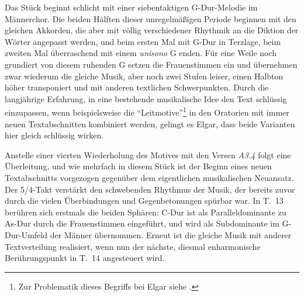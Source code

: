 \documentclass[a4paper,11pt,open=any]{scrbook}
\begin{document}
Das Stück beginnt schlicht mit einer siebentaktigen G-Dur-Melodie im
Männerchor.  Die beiden Hälften dieser unregelmäßigen Periode beginnen
mit den gleichen Akkorden, die aber mit völlig verschiedener Rhythmik
an die Diktion der Wörter angepasst werden, und beim ersten Mal mit G-Dur
in Terzlage, beim zweiten Mal überraschend mit einem \textit{unisono}
\textsf{G} enden.  Für eine Weile noch grundiert von diesem ruhenden
\textsf{G} setzen die Frauenstimmen ein und übernehmen zwar wiederum die
gleiche Musik, aber noch zwei Stufen leiser, einen Halbton höher transponiert
und mit anderen textlichen Schwerpunkten.  Durch die langjährige Erfahrung,
in eine bestehende musikalische Idee den Text schlüssig einzupassen, wenn
beispielsweise die \enquote{Leitmotive}\footnote{Zur Problematik dieses
Begriffs bei Elgar siehe \cite{csizmadia}.} in den Oratorien mit immer
neuen Textabschnitten kombiniert werden, gelingt es Elgar, dass beide
Varianten hier gleich schlüssig wirken.

Anstelle einer vierten Wiederholung des Motives mit den Versen
\textit{A3.4} folgt eine Überleitung, und wie mehrfach in diesem
Stück ist der Beginn eines neuen Textabschnitts vorgezogen gegenüber
dem eigentlichen musikalischen Neuansatz.  Der 5/4-Takt verstärkt den
schwebenden Rhythmus der Musik\cite[S.~524]{moore}, der bereits zuvor
durch die vielen Überbindungen und Gegenbetonungen spürbar war.  In T.~13
berühren sich erstmals die beiden Sphären: C-Dur ist als Paralleldominante
zu As-Dur durch die Frauenstimmen eingeführt, und wird als Subdominante im
G-Dur-Umfeld der Männer übernommen. Erneut ist die gleiche Musik mit anderer
Textverteilung realisiert, wenn nun der nächste, diesmal enharmonische
Berührungspunkt in T.~14 angesteuert wird.
\end{document}
